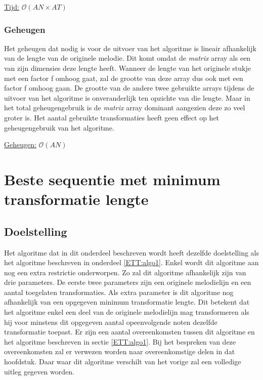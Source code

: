 \begin{center}
\underline{Tijd:} $\mathcal{O}(AN \times AT)$
\end{center}

\subsubsection{Geheugen}
Het geheugen dat nodig is voor de uitvoer van het algoritme is lineair afhankelijk van de lengte van de originele melodie. Dit komt omdat de \textit{matrix} array als een van zijn dimensies deze lengte heeft. Wanneer de lengte van het originele stukje met een factor f omhoog gaat, zal de grootte van deze array dus ook met een factor f omhoog gaan. De grootte van de andere twee gebruikte arrays tijdens de uitvoer van het algoritme is onveranderlijk ten opzichte van die lengte. Maar in het total geheugengebruik is de \textit{matrix} array dominant aangezien deze zo veel groter is. Het aantal gebruikte transformaties heeft geen effect op het geheugengebruik van het algoritme.

\begin{center}
\underline{Geheugen:} $\mathcal{O}(AN)$
\end{center}

\section{Beste sequentie met minimum transformatie lengte}
\label{ETT:algo2}

\subsection{Doelstelling}
Het algoritme dat in dit onderdeel beschreven wordt heeft dezelfde doelstelling als het algoritme beschreven in onderdeel \ref{ETT:algo1}. Enkel wordt dit algoritme aan nog een extra restrictie onderworpen. Zo zal dit algoritme afhankelijk zijn van drie parameters. De eerste twee parameters zijn een originele melodielijn en een aantal toegelaten transformaties. Als extra parameter is dit algoritme nog afhankelijk van een opgegeven minimum transformatie lengte. Dit betekent dat het algoritme enkel een deel van de originele melodielijn mag transformeren als hij voor minstens dit opgegeven aantal opeenvolgende noten dezelfde transformatie toepast. Er zijn een aantal overeenkomsten tussen dit algoritme en het algoritme beschreven in sectie \ref{ETT:algo1}. Bij het bespreken van deze overeenkomsten zal er verwezen worden naar overeenkomstige delen in dat hoofdstuk. Daar waar dit algoritme verschilt van het vorige zal een volledige uitleg gegeven worden.

